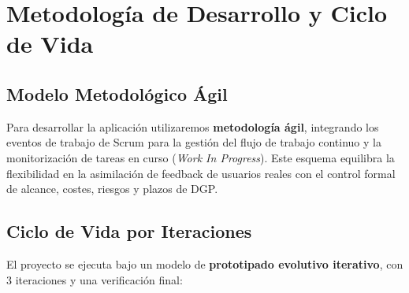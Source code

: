 \newpage
\section{Metodología de Desarrollo y Ciclo de Vida}

\subsection{Modelo Metodológico Ágil}
Para desarrollar la aplicación utilizaremos \textbf{metodología ágil}, integrando los eventos de trabajo de Scrum para la gestión del flujo de trabajo continuo y la monitorización de tareas en curso (\textit{Work In Progress}). Este esquema equilibra la flexibilidad en la asimilación de feedback de usuarios reales con el control formal de alcance, costes, riesgos y plazos de DGP.

\subsection{Ciclo de Vida por Iteraciones}
El proyecto se ejecuta bajo un modelo de \textbf{prototipado evolutivo iterativo}, con 3 iteraciones y una verificación final:

